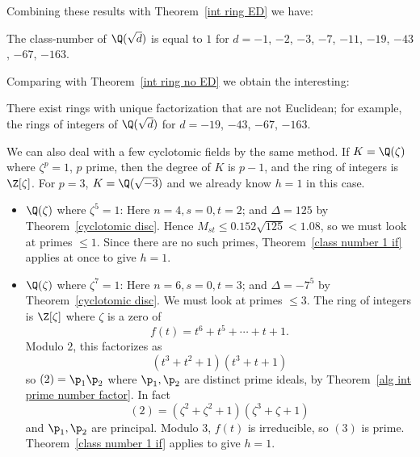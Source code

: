Combining these results with Theorem~\ref{int ring ED} we have:
\begin{proposition}
The class-number of $\Q(\sqrt{d})$ is equal to $1$ for $d=-1$, $-2$, $-3$, $-7$, $-11$, $-19$, $-43$, $-67$, $-163$.
\end{proposition}
Comparing with Theorem~\ref{int ring no ED} we obtain the interesting:
\begin{corollary}
There exist rings with unique factorization that are not Euclidean; for example, the rings of integers of $\Q(\sqrt{d})$ for $d=-19$, $-43$, $-67$, $-163$.
\end{corollary}
We can also deal with a few cyclotomic fields by the same method. If $K=\Q(\zeta)$ where $\zeta^p=1$, $p$ prime, then the degree of $K$ is $p-1$, and the ring of integers is $\Z[\zeta]$. For $p=3$, $K=\Q(\sqrt{-3})$ and we already know $h=1$ in this case.
\begin{example}
\mbox{}
\begin{itemize}
\item $\Q(\zeta)$ where $\zeta^5=1$: Here $n=4,s=0,t=2$; and $\Delta=125$ by Theorem~\ref{cyclotomic disc}. Hence $M_{st}\leq 0.152\sqrt{125}<1.08$, so we must look at primes $\leq1$. Since there are no such primes, Theorem~\ref{class number 1 if} applies at once to give $h=1$.
\item $\Q(\zeta)$ where $\zeta^7=1$: Here $n=6,s=0,t=3$; and $\Delta=-7^5$ by Theorem~\ref{cyclotomic disc}. We must look at primes $\leq3$. The ring of integers is $\Z[\zeta]$ where $\zeta$ is a zero of
\[f(t)=t^6+t^5+\cdots+t+1.\]
Modulo $2$, this factorizes as
\[(t^3+t^2+1)(t^3+t+1)\]
so $(2)=\p_1\p_2$ where $\p_1,\p_2$ are distinct prime ideals, by Theorem~\ref{alg int prime number factor}. In fact
\[(2)=(\zeta^2+\zeta^2+1)(\zeta^3+\zeta+1)\]
and $\p_1,\p_2$ are principal. Modulo $3$, $f(t)$ is irreducible, so $(3)$ is prime. Theorem~\ref{class number 1 if} applies to give $h=1$.
\end{itemize}
\end{example}